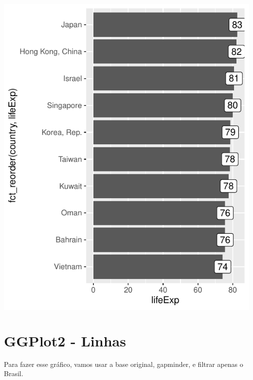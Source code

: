 \documentclass[
]{article}
\newenvironment{Shaded}{\begin{snugshade}}{\end{snugshade}}
\newcommand{\DataTypeTok}[1]{\textcolor[rgb]{0.13,0.29,0.53}{#1}}
\newcommand{\KeywordTok}[1]{\textcolor[rgb]{0.13,0.29,0.53}{\textbf{#1}}}
\newcommand{\NormalTok}[1]{#1}
\newcommand{\OperatorTok}[1]{\textcolor[rgb]{0.81,0.36,0.00}{\textbf{#1}}}
\newcommand{\StringTok}[1]{\textcolor[rgb]{0.31,0.60,0.02}{#1}}
\begin{document}
\begin{center}\includegraphics{arquivo_pdf_files/figure-latex/barras4-1} \end{center}

\hypertarget{ggplot2---linhas}{%
\section{GGPlot2 - Linhas}\label{ggplot2---linhas}}

Para fazer esse gráfico, vamos usar a base original, gapminder, e
filtrar apenas o Brasil.

\begin{Shaded}
\end{Shaded}
\end{document}

